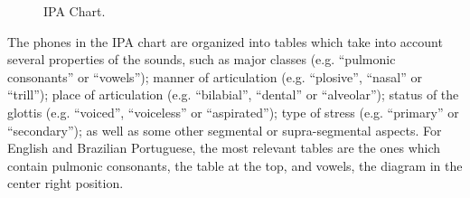 \begin{figure}[!ht]
        \noindent{}
        \caption{IPA Chart.}\label{fig:ipa-chart}
\end{figure}


The phones in the \ac{IPA} chart are organized into tables which take into account several properties of the sounds, such as major classes (e.g. ``pulmonic consonants'' or ``vowels''); manner of articulation (e.g. ``plosive'', ``nasal'' or ``trill''); place of articulation (e.g. ``bilabial'', ``dental'' or ``alveolar''); status of the glottis (e.g. ``voiced'', ``voiceless'' or ``aspirated''); type of stress (e.g. ``primary'' or ``secondary''); as well as some other segmental or supra-segmental aspects. For English and Brazilian Portuguese, the most relevant tables are the ones which contain pulmonic consonants, the table at the top, and vowels, the diagram in the center right position. 

